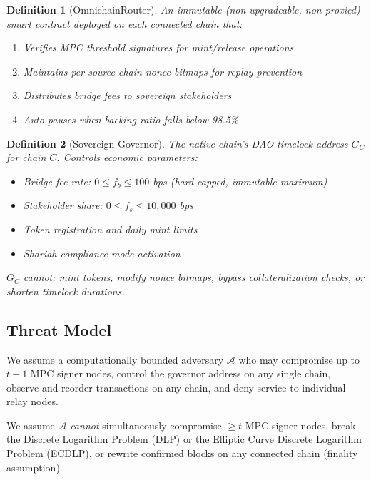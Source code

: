 \documentclass[11pt]{article}
\newtheorem{definition}{Definition}
\begin{document}
\begin{definition}[OmnichainRouter]
An immutable (non-upgradeable, non-proxied) smart contract deployed on each connected chain that:
\begin{enumerate}[nosep]
  \item Verifies MPC threshold signatures for mint/release operations
  \item Maintains per-source-chain nonce bitmaps for replay prevention
  \item Distributes bridge fees to sovereign stakeholders
  \item Auto-pauses when backing ratio falls below 98.5\%
\end{enumerate}
\end{definition}

\begin{definition}[Sovereign Governor]
The native chain's DAO timelock address $G_C$ for chain $C$. Controls economic parameters:
\begin{itemize}[nosep]
  \item Bridge fee rate: $0 \leq f_b \leq 100$ bps (hard-capped, immutable maximum)
  \item Stakeholder share: $0 \leq f_s \leq 10{,}000$ bps
  \item Token registration and daily mint limits
  \item Shariah compliance mode activation
\end{itemize}
$G_C$ \emph{cannot}: mint tokens, modify nonce bitmaps, bypass collateralization checks, or shorten timelock durations.
\end{definition}

\subsection{Threat Model}

We assume a computationally bounded adversary $\mathcal{A}$ who may compromise up to $t - 1$ MPC signer nodes, control the governor address on any single chain, observe and reorder transactions on any chain, and deny service to individual relay nodes.

We assume $\mathcal{A}$ \emph{cannot} simultaneously compromise $\geq t$ MPC signer nodes, break the Discrete Logarithm Problem (DLP) or the Elliptic Curve Discrete Logarithm Problem (ECDLP), or rewrite confirmed blocks on any connected chain (finality assumption).

\end{document}
